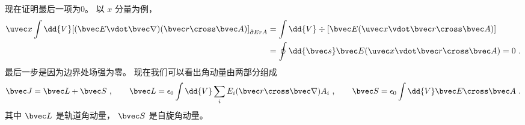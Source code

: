 现在证明最后一项为0。 以 $x$ 分量为例，
\begin{equation}
\begin{aligned}
\uvec x \int \dd{V} [(\bvec E \vdot \bvec\nabla )(\bvec r \cross \bvec A)]_{\partial ErA}  &= \int \dd{V} \div [\bvec E(\uvec x \vdot \bvec r \cross \bvec A) ] \\
&= \oint \dd{\bvec s} \bvec E(\uvec x \vdot \bvec r \cross \bvec A)  = 0~.
\end{aligned}
\end{equation}
最后一步是因为边界处场强为零。 现在我们可以看出角动量由两部分组成
\begin{equation}
\bvec J = \bvec L + \bvec S~, \qquad
\bvec L = \epsilon_0 \int \dd{V} \sum_i E_i (\bvec r \cross \bvec\nabla ) A_i ~,\qquad
\bvec S = \epsilon_0 \int \dd{V} \bvec E \cross \bvec A~.
\end{equation}
其中 $\bvec L$ 是轨道角动量， $\bvec S$ 是自旋角动量。
